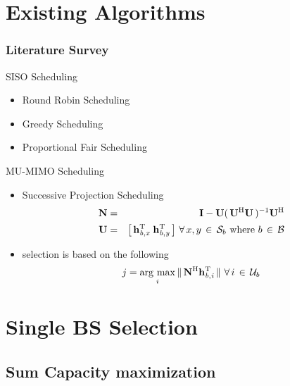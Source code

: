 \documentclass{beamer}
\begin{document}
\section{Existing Algorithms}

\begin{frame}
\frametitle{Literature Survey}
\begin{block}{SISO Scheduling}
\begin{itemize}
  \item Round Robin Scheduling
  \item Greedy Scheduling
  \item Proportional Fair Scheduling
\end{itemize}
\end{block}
\begin{block}{MU-MIMO Scheduling}
\begin{itemize}
  \item Successive Projection Scheduling \cite{sus2006zfbf}
  \begin{eqnarray*}
  \mathbf{N} &=& \mathbf{I} - \mathbf{U} ( \, \mathbf{U}^{\mathrm{H}} \mathbf{U} \, )^{-1} \mathbf{U}^{\mathrm{H}} \\
  \mathbf{U} &=& \left [ \, \mathbf{h}_{\mathit{b},\mathit{x}}^{\mathrm{T}} \; \mathbf{h}_{\mathit{b},\mathit{y}}^{\mathrm{T}} \, \right ] \, \forall \, x,y \, \in \, \mathcal{S}_b \text{ where } b \, \in \, \mathcal{B}
  \end{eqnarray*}
  \item selection is based on the following
  \begin{equation}
  j = \operatorname*{\arg\,max}_i \|\, \mathbf{N}^{\mathrm{H}} \mathbf{h}_{\mathit{b},\mathit{i}}^{\mathrm{T}} \,\| \, \, \forall \, i \, \in \, \mathcal{U}_b \nonumber
  \end{equation}

\end{itemize}
\end{block}
\end{frame}

\section{Single BS Selection}

\subsection{Sum Capacity maximization}
\end{document}
